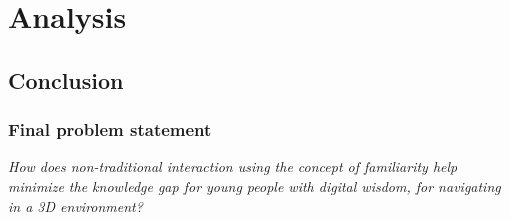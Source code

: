 \chapter{Analysis}







\section{Conclusion}
\subsection{Final problem statement}
\textit{How does non-traditional interaction using the concept of familiarity help minimize the knowledge gap for young people with digital wisdom, for navigating in a 3D environment?}
